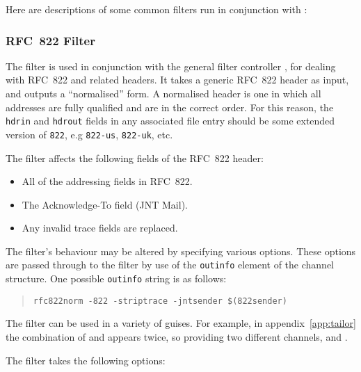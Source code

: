 
Here are descriptions of some common filters run in conjunction with
:

\subsubsection {RFC~822 Filter}

The filter  is used in conjunction with the
general filter controller , for dealing with RFC~822 and
related headers.  It takes a generic RFC~822 header as input, and
outputs a ``normalised'' form.  A normalised header is one in which
all addresses are fully qualified and are in the correct order.  For
this reason, the \verb+hdrin+ and {\verb+hdrout+} fields in any
associated  file entry should be some extended version of
{\verb+822+}, e.g \verb+822-us+, {\verb+822-uk+}, etc.

The filter affects the following fields of the RFC~822 header:

\begin{itemize}
\item All of the addressing fields in RFC~822.
\item The Acknowledge-To field (JNT Mail).
\item Any invalid trace fields are replaced.
\end{itemize}

The filter's behaviour may be altered by specifying various options.
These options are passed through  to the filter
by use of the \verb|outinfo| element of the channel structure.
One possible \verb|outinfo| string is as follows:
\begin{quote}\small\begin{verbatim}
rfc822norm -822 -striptrace -jntsender $(822sender)
\end{verbatim}\end{quote}

The  filter can be used in a variety of guises.
For example, in appendix~\ref{app:tailor} the combination of
 and  appears twice, so
providing two different channels,  and .

The filter takes the following options:

